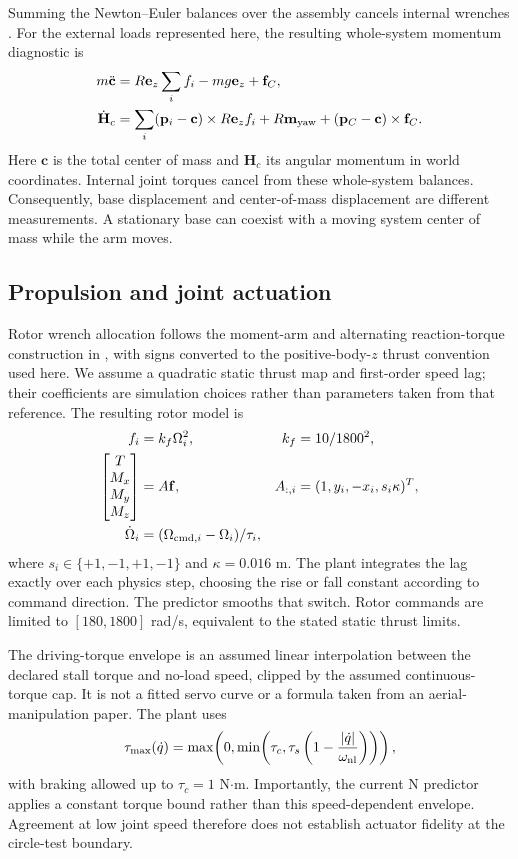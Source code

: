\documentclass[conference]{IEEEtran}
\begin{document}
Summing the Newton--Euler balances over the assembly cancels internal wrenches \cite[Secs.~8.2--8.3]{lynch2017}. For the external loads represented here, the resulting whole-system momentum diagnostic is
\begin{align}
m\ddot{\mathbf c}&=R\mathbf e_z\sum_i f_i-mg\mathbf e_z+\mathbf f_C,\label{eq:linearbalance}\\
\dot{\mathbf H}_{c}&=\sum_i(\mathbf p_i-\mathbf c)\times R\mathbf e_z f_i
+R\mathbf m_{\rm yaw}+(\mathbf p_C-\mathbf c)\times\mathbf f_C.
\label{eq:angularbalance}
\end{align}
Here $\mathbf c$ is the total center of mass and $\mathbf H_c$ its angular momentum in world coordinates. Internal joint torques cancel from these whole-system balances. Consequently, base displacement and center-of-mass displacement are different measurements. A stationary base can coexist with a moving system center of mass while the arm moves.

\subsection{Propulsion and joint actuation}
Rotor wrench allocation follows the moment-arm and alternating reaction-torque construction in \cite[Sec.~II]{lee2011}, with signs converted to the positive-body-$z$ thrust convention used here. We assume a quadratic static thrust map and first-order speed lag; their coefficients are simulation choices rather than parameters taken from that reference. The resulting rotor model is
\begin{align}
f_i&=k_f\Omega_i^2, &k_f&=10/1800^2,\\
\begin{bmatrix}T\\M_x\\M_y\\M_z\end{bmatrix}
&=A\mathbf f,&A_{:,i}&=(1,y_i,-x_i,s_i\kappa)^T,\label{eq:allocation}\\
\dot\Omega_i&=(\Omega_{{\rm cmd},i}-\Omega_i)/\tau_i,
\end{align}
where $s_i\in\{+1,-1,+1,-1\}$ and $\kappa=0.016$ m. The plant integrates the lag exactly over each physics step, choosing the rise or fall constant according to command direction. The predictor smooths that switch. Rotor commands are limited to $[180,1800]$ rad/s, equivalent to the stated static thrust limits.

The driving-torque envelope is an assumed linear interpolation between the declared stall torque and no-load speed, clipped by the assumed continuous-torque cap. It is not a fitted servo curve or a formula taken from an aerial-manipulation paper. The plant uses
\begin{equation}
\tau_{\max}(\dot q)=\max\!\left(0,\min\!\left(\tau_c,\tau_s\left(1-\frac{|\dot q|}{\omega_{\rm nl}}\right)\right)\right),
\label{eq:envelope}
\end{equation}
with braking allowed up to $\tau_c=1$ N$\cdot$m. Importantly, the current N predictor applies a constant torque bound rather than this speed-dependent envelope. Agreement at low joint speed therefore does not establish actuator fidelity at the circle-test boundary.
\end{document}
